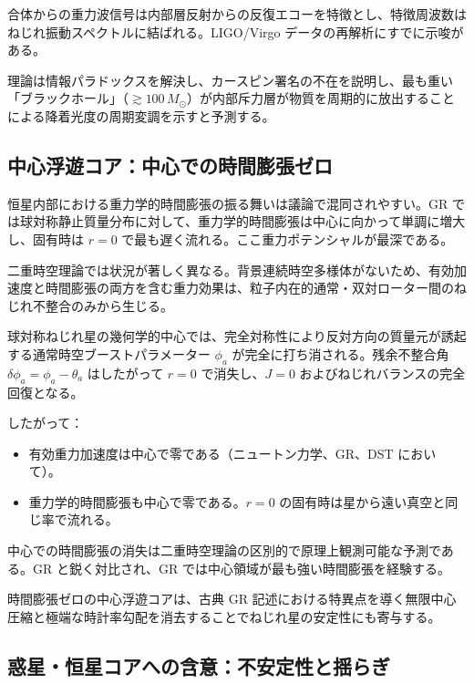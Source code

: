 \documentclass[a4paper]{article}
\begin{document}
合体からの重力波信号は内部層反射からの反復エコーを特徴とし、特徴周波数はねじれ振動スペクトルに結ばれる。LIGO/Virgo データの再解析にすでに示唆がある。

理論は情報パラドックスを解決し、カースピン署名の不在を説明し、最も重い「ブラックホール」（$\gtrsim 100\,M_\odot$）が内部斥力層が物質を周期的に放出することによる降着光度の周期変調を示すと予測する。

\subsection{中心浮遊コア：中心での時間膨張ゼロ}

恒星内部における重力学的時間膨張の振る舞いは議論で混同されやすい。GR では球対称静止質量分布に対して、重力学的時間膨張は中心に向かって単調に増大し、固有時は $r=0$ で最も遅く流れる。ここ重力ポテンシャルが最深である。

二重時空理論では状況が著しく異なる。背景連続時空多様体がないため、有効加速度と時間膨張の両方を含む重力効果は、粒子内在的通常・双対ローター間のねじれ不整合のみから生じる。

球対称ねじれ星の幾何学的中心では、完全対称性により反対方向の質量元が誘起する通常時空ブーストパラメーター $\phi_a$ が完全に打ち消される。残余不整合角 $\delta\phi_a = \phi_a - \theta_a$ はしたがって $r=0$ で消失し、$J=0$ およびねじれバランスの完全回復となる。

したがって：
\begin{itemize}
  \item 有効重力加速度は中心で零である（ニュートン力学、GR、DST において）。
  \item 重力学的時間膨張も中心で零である。$r=0$ の固有時は星から遠い真空と同じ率で流れる。
\end{itemize}

中心での時間膨張の消失は二重時空理論の区別的で原理上観測可能な予測である。GR と鋭く対比され、GR では中心領域が最も強い時間膨張を経験する。

時間膨張ゼロの中心浮遊コアは、古典 GR 記述における特異点を導く無限中心圧縮と極端な時計率勾配を消去することでねじれ星の安定性にも寄与する。

\subsection{惑星・恒星コアへの含意：不安定性と揺らぎ}
\end{document}
